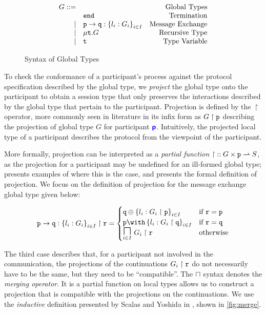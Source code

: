 \begin{figure}[!hb]
\doublespacing
\[
\begin{array}{rlr}

G ::= & & \text{Global Types} \\
     & \textnormal{\texttt{end}} & \text{Termination} \\
\mid & {\mathtt{p}} \to {\mathtt{q}} : \left\{ {l_i: G_i} \right\}_{i \in I} & \text{Message Exchange} \\
\mid & \mu\textnormal{\texttt{t}}.{G} & \text{Recursive Type} \\
\mid & \textnormal{\texttt{t}} & \text{Type Variable} \\
\end{array}
\]
\singlespacing
\caption{Syntax of Global Types}
\label{fig:globaltypes}
\end{figure}

To check the conformance of a participant's process 
against the protocol specification 
described by the global type, 
we \textit{project} the global type onto the participant
to obtain a session type that only preserves the 
interactions described by the global type that 
pertain to the participant. 
Projection is defined by the $\upharpoonright$ operator, 
more commonly seen in literature in its infix form 
as ${G} \upharpoonright {\mathtt{p}}$ describing the projection of global type 
$G$ for participant ${\color{blue}\bm{\mathsf{p}}}$. 
Intuitively, the projected local type of a participant 
describes the protocol from the viewpoint of the participant.

More formally, projection can be interpreted as a 
\textit{partial function} 
${\upharpoonright} :: G \times {\mathtt{p}} \rightharpoonup S$,
as the projection for a participant may be undefined for 
an ill-formed global type; 
\cite{C406Lecture} presents examples of where this is the case, 
and \cite{MPST} presents the formal definition of projection.
We focus on the definition of projection for the 
message exchange global type given below:

\[
\proj{\gcomm{p}{q}{l_i: G_i}{i \in I}}{r} =
\begin{cases}
\tsel{q}{l_i: \proj{G_i}{p}}{i \in I} 
	& \text{if } \mrole{r} = \mrole{p} \\
\tbra{p}{l_i: \proj{G_i}{q}}{i \in I} 
	& \text{if } \mrole{r} = \mrole{q} \\
\underset{i \in I}{\MERGEOP}~\proj{G_i}{r}
	& \text{otherwise} \\
\end{cases}
\]

The third case describes that,
for a participant not involved in the communication,
the projections of the continuations ${G_i} \upharpoonright {\mathtt{r}}$
do not necessarily have to be the same, but they
need to be ``compatible''. 
The $\sqcap$ syntax denotes the \textit{merging operator}.
It is a partial function on local types allows us to construct
a projection that is compatible with the projections on
the continuations.
We use the \textit{inductive} definition presented by
Scalas and Yoshida in \cite{LessIsMore}, shown in \cref{fig:merge}.


